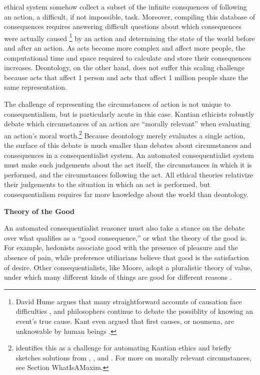 \begin{isabellebody}
\begin{isamarkuptext}
ethical system somehow collect a subset of the infinite consquences of following an action, a difficult, 
if not impossible, task. Moreover, compiling this database of consequences requires 
answering difficult questions about which consequences were actually caused \footnote
{David Hume argues that many straightforward accounts of causation face difficulties \citep{hume}, 
and philosophers continue to debate the possiblity of knowing an event's true cause. Kant even argued
that first causes, or noumena, are unknowable by human beings \citep{kantnoumena}.} by an action and
determining the state of the world before and after an action. As acts become
more complex and affect more people, the computational time and space required to calculate and store
their consequences increases. Deontology, on the other hand, does not suffer this scaling
challenge because acts that affect 1 person and acts that affect 1 million people share the same
representation.

The challenge of representing the circumstances of action is not unique to consequentialism, but is particularly acute in this case. 
Kantian ethicists robustly debate which circumstances of an action are ``morally relevant'' when evaluating an action's moral worth.\footnote{ 
\citet{powers} identifies this as a challenge for automating Kantian ethics and briefly sketches 
solutions from \citet{constofreason}, \citet{silber}, and \citet{rawlsconstructivism}. For more on 
morally relevant circumstances, see Section WhatIsAMaxim.} Because deontology merely evaluates a 
single action, the surface of this debate is much smaller than debates about circumstances and 
consequences in a consequentialist system. An automated consequentialist system must make such 
judgements about the act itself, the circumstances in which it is performed, and the circumstances 
following the act. All ethical theories relativize their judgements to the situation in which an act 
is performed, but consequentialism requires far more knowledge about the world than deontology.%
\end{isamarkuptext}\isamarkuptrue%
%
\begin{isamarkuptext}%
\noindent \textbf{Theory of the Good}%
\end{isamarkuptext}\isamarkuptrue%
%
\begin{isamarkuptext}%
An automated consequentialist reasoner must also take a stance on the debate over
what qualifies as a ``good consequence,'' or what the theory of the good is. For example, hedonists associate
good with the presence of pleasure and the absence of pain, while preference utiliarians believe that good is 
the satisfaction of desire. Other consequentialists, like Moore, adopt a pluralistic theory of value, under which 
many different kinds of things are good for different reasons \citep{moorepe}. 


\end{isamarkuptext}
\end{isabellebody}
